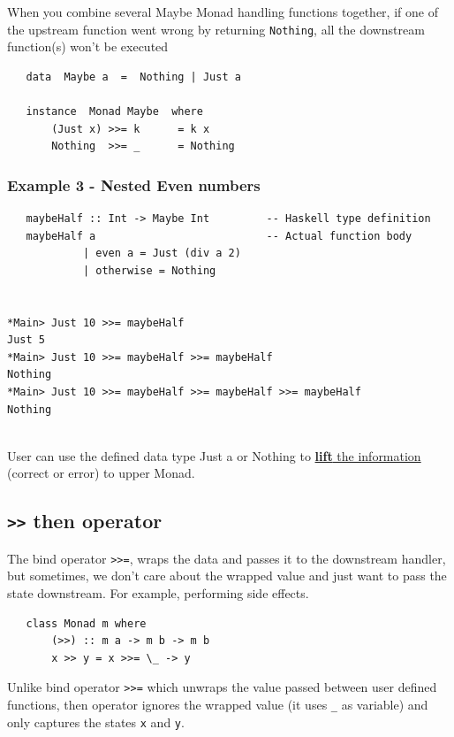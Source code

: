 When you combine several Maybe Monad handling functions together, if one of the upstream function went wrong by returning \lstinline|Nothing|, all the downstream function(s) won’t be executed

\begin{lstlisting}
   data  Maybe a  =  Nothing | Just a

   instance  Monad Maybe  where
       (Just x) >>= k      = k x
       Nothing  >>= _      = Nothing   
\end{lstlisting}

\subsubsection{Example 3 - Nested Even numbers}
\begin{lstlisting}
   maybeHalf :: Int -> Maybe Int         -- Haskell type definition
   maybeHalf a                           -- Actual function body
            | even a = Just (div a 2)
            | otherwise = Nothing


*Main> Just 10 >>= maybeHalf
Just 5
*Main> Just 10 >>= maybeHalf >>= maybeHalf
Nothing
*Main> Just 10 >>= maybeHalf >>= maybeHalf >>= maybeHalf
Nothing
            
\end{lstlisting}

User can use the defined data type Just a or Nothing to \ul{\textbf{lift} the information} (correct or error) to upper Monad.

\subsection{\texttt{>>} then operator}

The bind operator \texttt{>>=}, wraps the data and passes it to the downstream handler, but sometimes, we don't care about the wrapped value and just want to pass the state downstream. For example, performing side effects.

\begin{lstlisting}
   class Monad m where
       (>>) :: m a -> m b -> m b
       x >> y = x >>= \_ -> y   
\end{lstlisting}

Unlike bind operator \lstinline|>>=| which unwraps the value passed between user defined functions, then operator ignores the wrapped value (it uses \lstinline|_| as variable) and only captures the states \lstinline|x| and \lstinline|y|.

